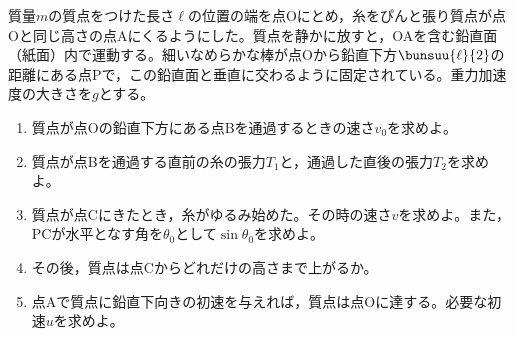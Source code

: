 \hakosyokika
\item
    \begin{mawarikomi}{150pt}{}
        質量$m$の質点をつけた長さ$\ell $の位置の端を点Oにとめ，糸をぴんと張り質点が点Oと同じ高さの点Aにくるようにした。質点を静かに放すと，OAを含む鉛直面（紙面）内で運動する。細いなめらかな棒が点Oから鉛直下方$\bunsuu{\ell }{2}$の距離にある点Pで，この鉛直面と垂直に交わるように固定されている。重力加速度の大きさを$g$とする。
        \begin{enumerate}
            \item 質点が点Oの鉛直下方にある点Bを通過するときの速さ$v_0$を求めよ。
            \item 質点が点Bを通過する直前の糸の張力$T_1$と，通過した直後の張力$T_2$を求めよ。
            \item 質点が点Cにきたとき，糸がゆるみ始めた。その時の速さ$v$を求めよ。また，PCが水平となす角を$\theta _0$として$\sin{\theta _0}$を求めよ。
            \item その後，質点は点Cからどれだけの高さまで上がるか。
            \item 点Aで質点に鉛直下向きの初速を与えれば，質点は点Oに達する。必要な初速$u$を求めよ。
        \end{enumerate}
    \end{mawarikomi}